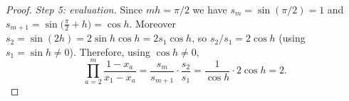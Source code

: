 \begin{proof}
\emph{Step 5: evaluation.} Since $mh=\pi/2$ we have
$s_m=\sin(\pi/2)=1$ and
$s_{m+1}=\sin\bigl(\tfrac{\pi}{2}+h\bigr)=\cos h$. Moreover
$s_2=\sin(2h)=2\sin h\cos h=2s_1\cos h$, so $s_2/s_1=2\cos h$ (using
$s_1=\sin h\ne0$). Therefore, using $\cos h\ne0$,
\[
  \prod_{a=2}^{m}\frac{1-x_a}{x_1-x_a}
  =\frac{s_m}{s_{m+1}}\cdot\frac{s_2}{s_1}
  =\frac{1}{\cos h}\cdot 2\cos h=2 .
\]
\end{proof}
